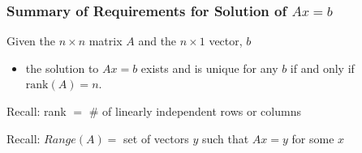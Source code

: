 \documentclass[10pt]{beamer}
\newcommand{\matdim}[2]{\ensuremath{#1\times#2}}
\newcommand{\rank}[1]{\ensuremath{\mathrm{rank}(#1)}}
\begin{document}
\begin{frame}
\frametitle{Summary of Requirements for Solution of $Ax=b$}

Given the \matdim{n}{n} matrix $A$ and the \matdim{n}{1} vector, $b$
\begin{itemize}
    \item   the solution to $Ax=b$ exists and is unique for any $b$
            if and only if $\rank{A}=n$.
\end{itemize}

\begin{alertblock}{}
Recall: rank $=$ \# of linearly independent rows or columns
\end{alertblock}

\begin{alertblock}{}
Recall: $Range(A) =$ set of vectors $y$ such that $Ax=y$ for some $x$
\end{alertblock}


\end{frame}
\end{document}
